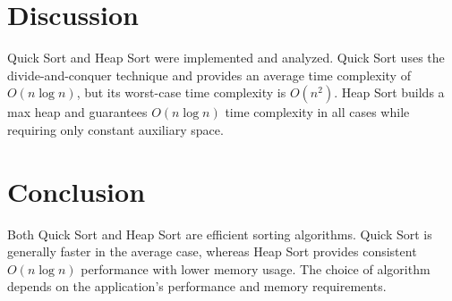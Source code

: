 \documentclass{article}
\begin{document}
{\section*{Discussion}

Quick Sort and Heap Sort were implemented and analyzed. Quick Sort uses the divide-and-conquer technique and provides an average time complexity of $O(n \log n)$, but its worst-case time complexity is $O(n^2)$. Heap Sort builds a max heap and guarantees $O(n \log n)$ time complexity in all cases while requiring only constant auxiliary space.

\section*{Conclusion}

Both Quick Sort and Heap Sort are efficient sorting algorithms. Quick Sort is generally faster in the average case, whereas Heap Sort provides consistent $O(n \log n)$ performance with lower memory usage. The choice of algorithm depends on the application's performance and memory requirements.

}
\end{document}
